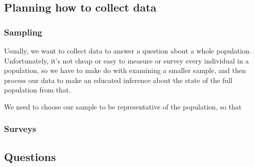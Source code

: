 \subsection*{Planning how to collect data}
\subsubsection*{Sampling}
Usually, we want to collect data to answer a question about a whole population. Unfortunately, it's not cheap or easy to measure or survey every individual
in a population, so we have to make do with examining a smaller sample, and then process our data to make an educated inference about
the state of the full population from that.

We need to choose our sample to be representative of the population, so that

\subsubsection*{Surveys}

\subsection*{Questions}
\begin{questions}
  \question
\end{questions}



